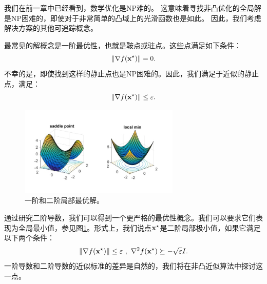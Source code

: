 我们在前一章中已经看到，数学优化是NP难的。
这意味着寻找非凸优化的全局解是NP困难的，即使对于非常简单的凸域上的光滑函数也是如此。
因此，我们考虑解决方案的其他可追踪概念。

最常见的解概念是一阶最优性，也就是鞍点或驻点。这些点满足如下条件：
$$  \| \nabla f(\mathbf x^\star ) \| = 0 . $$
不幸的是，即使找到这样的静止点也是NP困难的。因此，我们满足于近似的静止点，满足：
$$  \| \nabla f(\mathbf x^\star ) \| \leq \varepsilon . $$

\begin{figure}[h!]
\begin{center}
\includegraphics[width=3in]{./figs/optimums}
\end{center}
\caption{
一阶和二阶局部最优解。
\label{fig:optimums}}
\end{figure}

通过研究二阶导数，我们可以得到一个更严格的最优性概念。我们可以要求它们表现为全局最小值，参见图\ref{fig:optimums}。形式上，我们说点$\mathbf x^\star$是二阶局部极小值，如果它满足以下两个条件：
$$  \| \nabla f(\x^\star ) \| \leq \epsilon  \ , \   \nabla^2 f(\x^\star) \succeq -\sqrt{\eps} I . $$
一阶导数和二阶导数的近似标准的差异是自然的，我们将在非凸近似算法中探讨这一点。

